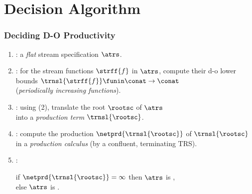 \documentclass[10pt]{beamer}
\begin{document}
\section{Decision Algorithm}


\begin{frame}%
  \frametitle{Deciding D-O Productivity}


  \begin{enumerate}
      \vspace*{1.65ex}
    \item  {}: a \emph{flat} stream specification $\atrs$.
      \vspace*{1.65ex}
    \item  {}:
      for the stream functions $\strff{f}$ in $\atrs$,
      compute their d-o lower bounds
      $\trnsl{\strff{f}} \funin \conat \to \conat$
      \\ \hspace*{\fill}
      (\emph{periodically increasing functions}).
      \vspace*{1.65ex}
    \item  {}: using (2),
      translate the root $\rootsc$ of $\atrs$\\
      into a \emph{production term} $\trnsl{\rootsc}$.
      \vspace*{1.65ex}
    \item  {}:
      compute the production $\netprd{\trnsl{\rootsc}}$ of $\trnsl{\rootsc}$\\
      in a \emph{production calculus} (by a {confluent, terminating TRS}).
      \vspace*{1.65ex}
    \item {}:
      \parbox[t]{200pt}{%
           if $\netprd{\trnsl{\rootsc}}=\infty$
             then $\atrs$ is ,\\
             else $\atrs$ is .%
                        }
  \end{enumerate}

\end{frame}%
\end{document}
